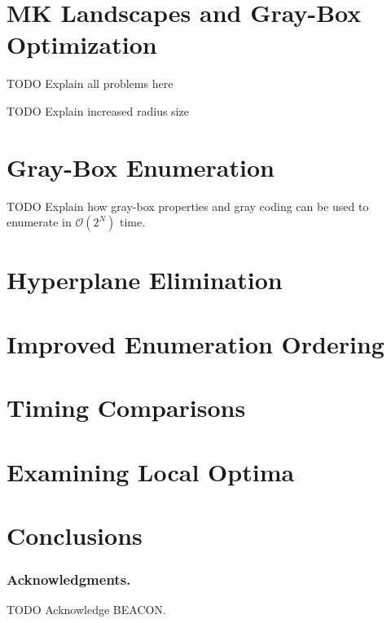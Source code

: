 \documentclass[runningheads,a4paper]{llncs}
\newcommand{\BigO}[1]{$\mathcal{O}{(#1)}$}
\begin{document}
\section{MK Landscapes and Gray-Box Optimization}
TODO Explain all problems here

TODO Explain increased radius size~\cite{chicano:2014:ball}

\section{Gray-Box Enumeration}
TODO Explain how gray-box properties and gray coding can be used to
enumerate in \BigO{2^N} time.

\section{Hyperplane Elimination}

\section{Improved Enumeration Ordering}

\section{Timing Comparisons}

\section{Examining Local Optima}

\section{Conclusions}

\subsubsection*{Acknowledgments.} TODO Acknowledge BEACON.



\end{document}
